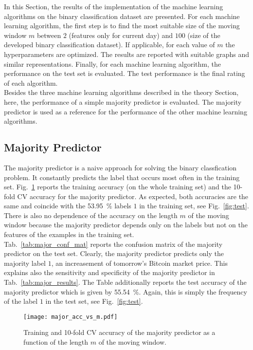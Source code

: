In this Section, the results of the implementation of the machine learning algorithms on the binary classification dataset are presented. For each machine learning algorithm, the first step is to find the most suitable size of the moving window $m$ between $2$ (features only for current day) and $100$ (size of the developed binary classification dataset). If applicable, for each value of $m$ the hyperparameters are optimized. The results are reported with suitable graphs and similar representations. Finally, for each machine learning algorithm, the performance on the test set is evaluated. The test performance is the final rating of each algorithm.\\

Besides the three machine learning algorithms described in the theory Section, here, the performance of a simple majority predictor is evaluated. The majority predictor is used as a reference for the performance of the other machine learning algorithms.

\subsection{Majority Predictor}
The majority predictor is a naive approach for solving the binary classfication problem. It constantly predicts the label that occurs most often in the training set. Fig.~\ref{fig:major_acc_vs_m} reports the training accuracy (on the whole training set) and the 10-fold CV accuracy for the majority predictor. As expected, both accuracies are the same and coincide with the \SI{53.95}{\percent} labels $1$ in the training set, see Fig.~\ref{fig:test}. There is also no dependence of the accuracy on the length $m$ of the moving window because the majority predictor depends only on the labels but not on the features of the examples in the training set.\\

Tab.~\ref{tab:major_conf_mat} reports the confusion matrix of the majority predictor on the test set. Clearly, the majority predictor predicts only the majority label $1$, an increasement of tomorrow's Bitcoin market price.  This explains also the sensitivity and specificity of the majority predictor in Tab.~\ref{tab:major_results}. The Table additionally reports the test accuracy of the majority predictor which is given by \SI{55.54}{\percent}. Again, this is simply the frequency of the label $1$ in the test set, see Fig.~\ref{fig:test}.

\begin{figure}[h!]
  \centering
  \texttt{[image: major\_acc\_vs\_m.pdf]}
  \caption{Training and 10-fold CV accuracy of the majority predictor as a function of the length $m$ of the moving window.}
  \label{fig:major_acc_vs_m}
\end{figure}

